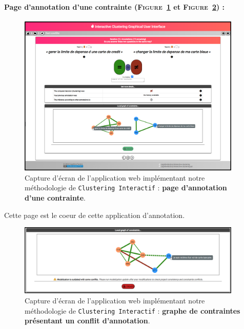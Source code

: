 	
	\newpage
	\paragraph{Page d'annotation d'une contrainte (\textsc{Figure~\ref{figure:C-WEB-APPLICATION-ANNOTATION}} et \textsc{Figure~\ref{figure:C-WEB-APPLICATION-CONFLIT}}) :}
	
		\begin{figure}[H]
			\centering
			\includegraphics[width=0.95\textwidth]{figures/interactive-clustering-application-annotation-0full}
			\caption{
				Capture d'écran de l'application web implémentant notre méthodologie de \texttt{Clustering Interactif} : \textbf{page d'annotation d'une contrainte}.
			}
			\label{figure:C-WEB-APPLICATION-ANNOTATION}
		\end{figure}
		
		Cette page est le coeur de cette application d'annotation.
		
		\begin{figure}[H]
			\centering
			\includegraphics[width=0.95\textwidth]{figures/interactive-clustering-application-annotation-4conflit}
			\caption{
				Capture d'écran de l'application web implémentant notre méthodologie de \texttt{Clustering Interactif} : \textbf{graphe de contraintes présentant un conflit d'annotation}.
			}
			\label{figure:C-WEB-APPLICATION-CONFLIT}
		\end{figure}
